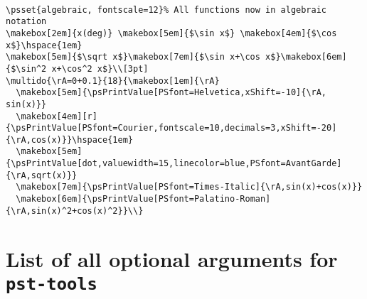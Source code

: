 \documentclass[11pt,english,BCOR10mm,DIV12,bibliography=totoc,parskip=false,
   smallheadings, headexclude,footexclude,oneside]{pst-doc}
\begin{document}
\begin{center}
  \hspace{1em}
\\[3pt]
\end{center}

\bigskip

\begin{lstlisting}
\psset{algebraic, fontscale=12}% All functions now in algebraic notation
\makebox[2em]{x(deg)} \makebox[5em]{$\sin x$} \makebox[4em]{$\cos x$}\hspace{1em}
\makebox[5em]{$\sqrt x$}\makebox[7em]{$\sin x+\cos x$}\makebox[6em]{$\sin^2 x+\cos^2 x$}\\[3pt]
\multido{\rA=0+0.1}{18}{\makebox[1em]{\rA}
  \makebox[5em]{\psPrintValue[PSfont=Helvetica,xShift=-10]{\rA, sin(x)}}
  \makebox[4em][r]{\psPrintValue[PSfont=Courier,fontscale=10,decimals=3,xShift=-20]{\rA,cos(x)}}\hspace{1em}
  \makebox[5em]{\psPrintValue[dot,valuewidth=15,linecolor=blue,PSfont=AvantGarde]{\rA,sqrt(x)}}
  \makebox[7em]{\psPrintValue[PSfont=Times-Italic]{\rA,sin(x)+cos(x)}}
  \makebox[6em]{\psPrintValue[PSfont=Palatino-Roman]{\rA,sin(x)^2+cos(x)^2}}\\}
\end{lstlisting}

\clearpage
\section{List of all optional arguments for \texttt{pst-tools}}





\bgroup
\raggedright
\nocite{*}


\egroup

\printindex
\end{document}
